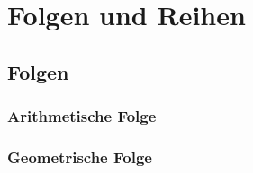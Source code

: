 \section{Folgen und Reihen}
\subsection{Folgen}
\subsubsection{Arithmetische Folge}
\subsubsection{Geometrische Folge}